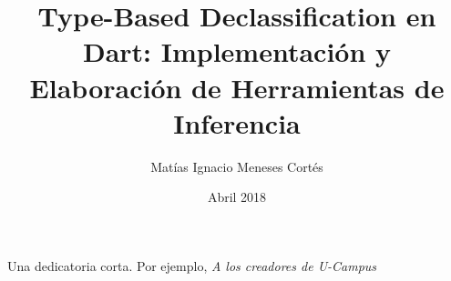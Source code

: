 \documentclass[upright, contnum]{umemoria}
\author{Matías Ignacio Meneses Cortés}
\title{Type-Based Declassification en Dart: Implementación y Elaboración de Herramientas de Inferencia}
\date{Abril 2018}
\begin{document}
\frontmatter
\maketitle

\begin{abstract}
{\lipsum[1-4]}
\end{abstract}

\begin{dedicatoria} %
Una dedicatoria corta. Por ejemplo, \emph{A los creadores de U-Campus}
\end{dedicatoria}

\begin{thanks} %
\lipsum[1-2]
\end{thanks}
\cleardoublepage

\tableofcontents
\listoftables %
\listoffigures %

\mainmatter












\end{document}
